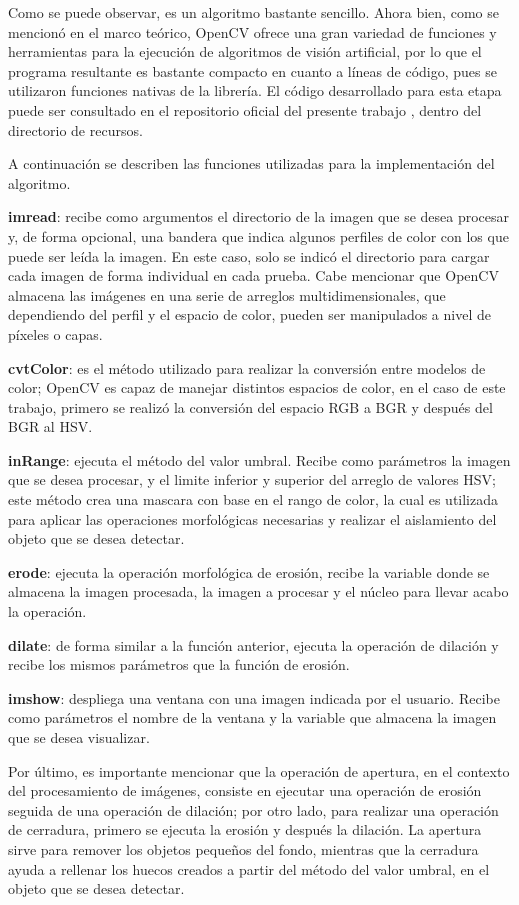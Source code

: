 Como se puede observar, es un algoritmo bastante sencillo. Ahora bien, como se mencionó en el marco teórico, OpenCV ofrece una gran variedad de funciones y herramientas para la ejecución de algoritmos de visión artificial, por lo que el programa resultante es bastante compacto en cuanto a líneas de código, pues se utilizaron funciones nativas de la librería. El código desarrollado para esta etapa puede ser consultado en el repositorio oficial del presente trabajo \citet{Axolotl}, dentro del directorio de recursos.

A continuación se describen las funciones utilizadas para la implementación del algoritmo.

\textbf{imread}: recibe como argumentos el directorio de la imagen que se desea procesar y, de forma opcional, una bandera que indica algunos perfiles de color con los que puede ser leída la imagen. En este caso, solo se indicó el directorio para cargar cada imagen de forma individual en cada prueba. Cabe mencionar que OpenCV almacena las imágenes en una serie de arreglos multidimensionales, que dependiendo del perfil y el espacio de color, pueden ser manipulados a nivel de píxeles o capas.

\textbf{cvtColor}: es el método utilizado para realizar la conversión entre modelos de color; OpenCV es capaz de manejar distintos espacios de color, en el caso de este trabajo, primero se realizó la conversión del espacio RGB a BGR y después del BGR al HSV.

\textbf{inRange}: ejecuta el método del valor umbral. Recibe como parámetros la imagen que se desea procesar, y el limite inferior y superior del arreglo de valores HSV; este método crea una mascara con base en el rango de color, la cual es utilizada para aplicar las operaciones morfológicas necesarias y realizar el aislamiento del objeto que se desea detectar.

\textbf{erode}: ejecuta la operación morfológica de erosión, recibe la variable donde se almacena la imagen procesada, la imagen a procesar y el núcleo para llevar acabo la operación.

\textbf{dilate}: de forma similar a la función anterior, ejecuta la operación de dilación y recibe los mismos parámetros que la función de erosión.

\textbf{imshow}: despliega una ventana con una imagen indicada por el usuario. Recibe como parámetros el nombre de la ventana y la variable que almacena la imagen que se desea visualizar.

Por último, es importante mencionar que la operación de apertura, en el contexto del procesamiento de imágenes, consiste en ejecutar una operación de erosión seguida de una operación de dilación; por otro lado, para realizar una operación de cerradura, primero se ejecuta la erosión y después la dilación. La apertura sirve para remover los objetos pequeños del fondo, mientras que la cerradura ayuda a rellenar los huecos creados a partir del método del valor umbral, en el objeto que se desea detectar.

